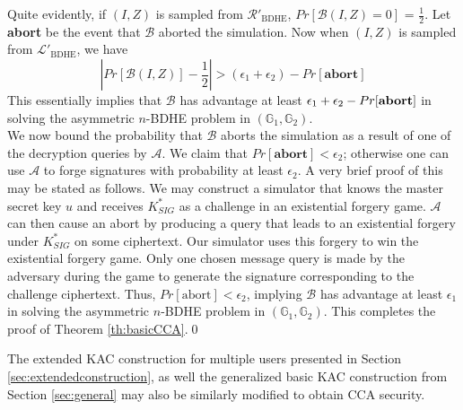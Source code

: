 \noindent Quite evidently, if $(I,Z)$ is sampled from ${\mathcal{R}'}_{\text{BDHE}}$, $Pr[\mathcal{B}(I,Z)=0]$ = $\frac{1}{2}$. Let \textbf{abort} be the event that $\mathcal{B}$ aborted the simulation. Now when $(I,Z)$ is sampled from ${\mathcal{L}'}_{\text{BDHE}}$, we have 
\begin{equation}
 |Pr[\mathcal{B}(I,Z)]-\frac{1}{2}|>(\epsilon_1+\epsilon_2)-Pr[\textbf{abort}] \nonumber
\end{equation}
\noindent This essentially implies that $\mathcal{B}$ has advantage at least $\epsilon_1+\epsilon_2-Pr[\text{\textbf{abort}}]$ in solving the asymmetric $n$-BDHE problem in $(\mathbb{G}_1,\mathbb{G}_2)$.\\


\noindent We now bound the probability that $\mathcal{B}$ aborts the simulation as a result of one of the decryption queries by $\mathcal{A}$. We claim that $Pr[\textbf{abort}]<\epsilon_2$; otherwise one can use $\mathcal{A}$ to forge signatures with probability at least $\epsilon_2$. A very brief proof of this may be stated as follows. We may construct a simulator that knows the master secret key $u$ and receives ${K^{*}_{SIG}}$ as a challenge in an existential forgery game. $\mathcal{A}$ can then cause an abort by producing a query that leads to an existential forgery under ${K^{*}_{SIG}}$ on some ciphertext. Our simulator uses this forgery to win the existential forgery game. Only one chosen message query is made by the adversary during the game to generate the signature corresponding to the challenge ciphertext. Thus, $Pr[\text{abort}]<\epsilon_2$, implying $\mathcal{B}$ has advantage at least $\epsilon_1$ in solving the asymmetric $n$-BDHE problem in $(\mathbb{G}_1,\mathbb{G}_2)$. This completes the proof of Theorem \ref{th:basicCCA}.\hfill\qed 

The extended KAC construction for multiple users presented in Section \ref{sec:extendedconstruction}, as well the generalized basic KAC construction from Section \ref{sec:general} may also be similarly modified to obtain CCA security.  





